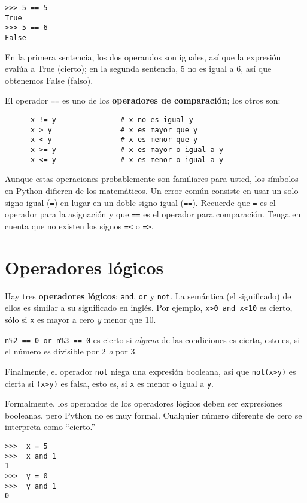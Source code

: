 \begin{lstlisting}
>>> 5 == 5
True
>>> 5 == 6
False
\end{lstlisting}
 En la primera sentencia, los dos operandos son iguales, así que la
expresión evalúa a True (cierto); en la segunda sentencia, 5 no es
igual a 6, así que obtenemos False (falso).

El operador \texttt{==} es uno de los \textbf{operadores de comparación};
los otros son:
\begin{lstlisting}
      x != y               # x no es igual y
      x > y                # x es mayor que y
      x < y                # x es menor que y
      x >= y               # x es mayor o igual a y
      x <= y               # x es menor o igual a y
\end{lstlisting}

Aunque estas operaciones probablemente son familiares para usted,
los símbolos en Python difieren de los matemáticos. Un error común
consiste en usar un solo signo igual (\texttt{=}) en lugar en un doble
signo igual (\texttt{==}). Recuerde que \texttt{=} es el operador
para la asignación y que \texttt{==} es el operador para comparación.
Tenga en cuenta que no existen los signos \texttt{=<} o \texttt{=>}.

\section{Operadores lógicos}

 

Hay tres \textbf{operadores lógicos}: \texttt{and}, \texttt{or} y
\texttt{not}. La semántica (el significado) de ellos es similar a
su significado en inglés. Por ejemplo, \texttt{x>0 and x<10} es cierto,
sólo si \texttt{x} es mayor a cero {\em y} menor que 10.

\texttt{n\%2 == 0 or n\%3 == 0} es cierto si {\em alguna} de las
condiciones es cierta, esto es, si el número es divisible por 2 {\em
o} por 3.

Finalmente, el operador \texttt{not} niega una expresión booleana,
así que \texttt{not(x>y)} es cierta si \texttt{(x>y)} es falsa, esto
es, si \texttt{x} es menor o igual a \texttt{y}.

Formalmente, los operandos de los operadores lógicos deben ser expresiones
booleanas, pero Python no es muy formal. Cualquier número diferente
de cero se interpreta como ``cierto.''
\begin{lstlisting}
>>>  x = 5
>>>  x and 1
1
>>>  y = 0
>>>  y and 1
0
\end{lstlisting}

